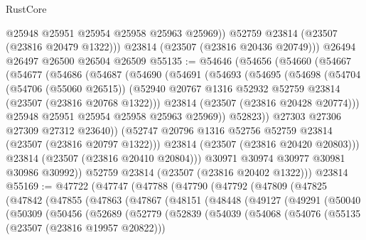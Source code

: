 \begin{lexlean}{RustCore}
\begin{coremodule}
            @25948
            @25951
            @25954
            @25958
            @25963
            @25969))
        @52759
        @23814
        (@23507 (@23816 @20479 @1322)))
      @23814
      (@23507 (@23816 @20436 @20749)))
    @26494
    @26497
    @26500
    @26504
    @26509
@55135 := @54646
    (@54656
      (@54660
        (@54667
          (@54677
            (@54686
              (@54687
                (@54690
                  (@54691
                    (@54693
                      (@54695
                        (@54698
                          (@54704
                            (@54706 (@55060 @26515))
                            (@52940
                              @20767
                              @1316
                              @52932
                              @52759
                              @23814
                              (@23507 (@23816 @20768 @1322)))
                            @23814
                            (@23507 (@23816 @20428 @20774)))
                          @25948
                          @25951
                          @25954
                          @25958
                          @25963
                          @25969))
                      @52823))
                  @27303
                  @27306
                  @27309
                  @27312
                  @23640))
              (@52747 @20796 @1316 @52756 @52759 @23814 (@23507 (@23816 @20797 @1322)))
              @23814
              (@23507 (@23816 @20420 @20803)))
            @23814
            (@23507 (@23816 @20410 @20804)))
          @30971
          @30974
          @30977
          @30981
          @30986
          @30992))
      @52759
      @23814
      (@23507 (@23816 @20402 @1322)))
    @23814
@55169 := @47722
    (@47747
      (@47788
        (@47790
          (@47792
            (@47809
              (@47825
                (@47842
                  (@47855
                    (@47863
                      (@47867
                        (@48151
                          (@48448
                            (@49127
                              (@49291
                                (@50040
                                  (@50309
                                    (@50456
                                      (@52689
                                        (@52779
                                          (@52839
                                            (@54039
                                              (@54068
                                                (@54076
                                                  (@55135 (@23507 (@23816 @19957 @20822)))

\end{coremodule}
\end{lexlean}
